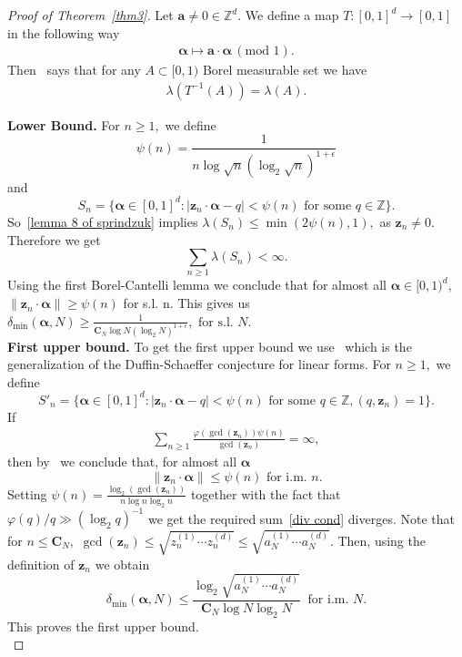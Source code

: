 \documentclass[12pt,article]{amsart}
\theoremstyle{remark}
\numberwithin{equation}{section}
\renewcommand{\phi}{\varphi}
\newcommand{\Z}{\mathbb{Z}}
\newcommand{\boldz}{\boldsymbol{z}}
\newcommand{\bolda}{\boldsymbol{a}}
\newcommand{\boldCN}{\boldsymbol{C}_N}
\newcommand{\boldalpha}{\boldsymbol{\alpha}}
\begin{document}
	\begin{proof}[Proof of Theorem~\ref{thm3}]
		
		Let $\bolda\neq0\in\Z^d.$ We define a map $T:[0,1]^d\to[0,1]$ in the following way
		\begin{align*}
			\boldalpha\mapsto\bolda\cdot\boldalpha\,(\text{mod } 1).
		\end{align*}
		Then~\cite[Lemma 8]{sprindzuk} says that for any $A\subset[0,1)$ Borel measurable set we have
		\begin{align}\label{lemma 8 of sprindzuk}
			\lambda(T^{-1}(A))=\lambda(A).
		\end{align}
		
		\textbf{Lower Bound.}
		For $n\geq 1,$ we define
		$$\psi(n)=\frac{1}{n\log \sqrt{n}(\log_2 \sqrt{n})^{1+\epsilon}}$$ and
		$$S_n=\{\boldalpha\in[0,1]^d:|\boldz_n\cdot\boldalpha-q|<\psi(n) \text{ for some } q\in\Z\}.$$
		So~\eqref{lemma 8 of sprindzuk} implies $\lambda(S_n)\leq\min(2\psi(n),1),$ as $\boldz_n\neq0.$ Therefore we get
		$$\sum_{n\geq 1}\lambda(S_n)<\infty.$$
		Using the first Borel-Cantelli lemma we conclude that for almost all $\boldalpha\in[0,1)^d$, $\|\boldz_n\cdot\boldalpha\|\geq\psi(n)$ for s.l. n.
		This gives us $\delta_{\text{min}}(\boldalpha,N)\geq \frac{1}{\boldCN\log N(\log_2 N)^{1+\epsilon}}, \text{ for s.l. }N.$\\
		
		\textbf{First upper bound.}
		To get the first upper bound we use~\cite[Theorem 1]{remirez} which is the generalization of the Duffin-Schaeffer conjecture for linear forms.
		For $n\geq 1,$ we define
		\[S'_n=\{\boldalpha\in[0,1]^d:|\boldz_n\cdot\boldalpha-q|<\psi(n) \text{ for some } q\in\Z, (q,\boldz_n)=1\}.\] 
		If
		\begin{align}\label{div cond}
			\sum_{n\geq 1}\frac{\phi(\gcd(\boldz_n))\psi(n)}{\gcd(\boldz_n)}=\infty,
		\end{align}
		then by~\cite[Theorem 1]{remirez} we conclude that, for almost all $\boldalpha$
		\[\|\boldz_n\cdot\boldalpha\|\leq \psi(n)\text{ for i.m. }n.\] 
		Setting $\psi(n)=\frac{\log_2(\gcd(\boldz_n))}{n\log n\log_2 n}$ together with the fact that $\phi(q)/q\gg(\log_2 q)^{-1}$ we get the required sum~\eqref{div cond} diverges. Note that for $n\leq\boldCN,$ $\gcd(\boldz_n)\leq\sqrt{z_n^{(1)}\cdots z_n^{(d)}}\leq\sqrt{a_N^{(1)}\cdots a_N^{(d)}}.$ 
		Then, using the definition of $\boldz_n$ we obtain
		\[\delta_{\text{min}}(\boldalpha,N)\leq\frac{\log_2\sqrt{a_N^{(1)}\cdots a_N^{(d)}}}{\boldCN\log N\log_2 N}\: \text{  for i.m. } N.\]
		This proves the first upper bound. \\
		

\end{proof}
\end{document}
